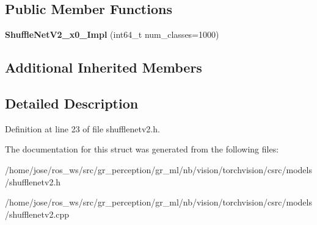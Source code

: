 \subsection*{Public Member Functions}
\begin{DoxyCompactItemize}
\item 
\mbox{\label{structvision_1_1models_1_1ShuffleNetV2__x0__5Impl_a4c46cc1208c733497d121aa71608c13e}} 
{\bfseries Shuffle\+Net\+V2\+\_\+x0\+\_\+Impl} (int64\+\_\+t num\+\_\+classes=1000)
\end{DoxyCompactItemize}
\subsection*{Additional Inherited Members}


\subsection{Detailed Description}


Definition at line 23 of file shufflenetv2.\+h.



The documentation for this struct was generated from the following files\+:\begin{DoxyCompactItemize}
\item 
/home/jose/ros\+\_\+ws/src/gr\+\_\+perception/gr\+\_\+ml/nb/vision/torchvision/csrc/models/shufflenetv2.\+h\item 
/home/jose/ros\+\_\+ws/src/gr\+\_\+perception/gr\+\_\+ml/nb/vision/torchvision/csrc/models/shufflenetv2.\+cpp\end{DoxyCompactItemize}
